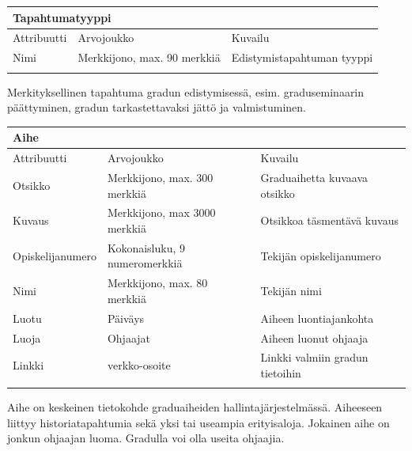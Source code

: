 \documentclass[11pt,a4paper,finnish,oneside]{article}
\begin{document}
\vspace{2em}
    \begin{tabular}{ | p{3cm} | p{3cm} | p{6cm} |}
    \multicolumn{3}{l}{\textbf{Tapahtumatyyppi}} \\ \hline
    {\small Attribuutti} & {\small Arvojoukko} & {\small Kuvailu}\\ \hline
    Nimi & Merkkijono, max. 90 merkkiä & Edistymistapahtuman tyyppi\\ \hline
    \multicolumn{3}{l}{} \\

    \end{tabular}
Merkityksellinen tapahtuma gradun edistymisessä, esim. graduseminaarin päättyminen, gradun tarkastettavaksi jättö ja valmistuminen.

\vspace{2em}
    \begin{tabular}{ | p{3cm} | p{3cm} | p{6cm} |}
    \multicolumn{3}{l}{\textbf{Aihe}} \\ \hline
    {\small Attribuutti} & {\small Arvojoukko} & {\small Kuvailu}\\ \hline
    Otsikko & Merkkijono, max. 300 merkkiä & Graduaihetta kuvaava otsikko\\ \hline
    Kuvaus & Merkkijono, max 3000 merkkiä & Otsikkoa täsmentävä kuvaus \\ \hline
    Opiskelijanumero & Kokonaisluku, 9 numeromerkkiä & Tekijän opiskelijanumero \\\hline
    Nimi & Merkkijono, max. 80 merkkiä & Tekijän nimi \\\hline
    Luotu & Päiväys & Aiheen luontiajankohta\\\hline
    Luoja & Ohjaajat & Aiheen luonut ohjaaja\\\hline
    Linkki & verkko-osoite & Linkki valmiin gradun tietoihin\\\hline
    
    \multicolumn{3}{l}{} \\

    \end{tabular}
Aihe on keskeinen tietokohde graduaiheiden hallintajärjestelmässä. Aiheeseen liittyy historiatapahtumia sekä yksi tai useampia erityisaloja. Jokainen aihe on jonkun ohjaajan luoma. Gradulla voi olla useita ohjaajia.
\end{document}
